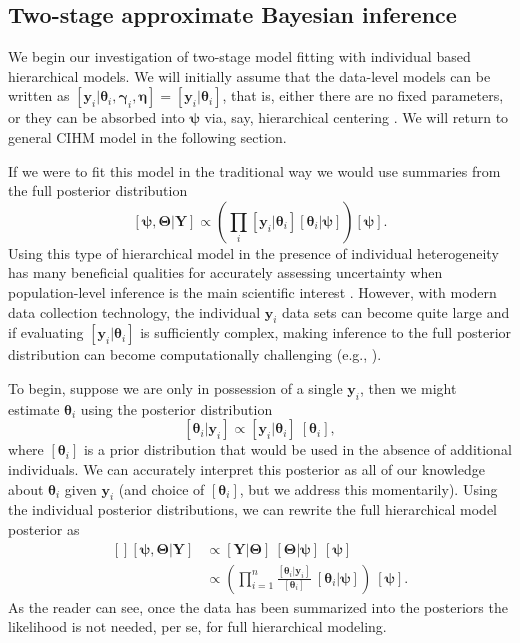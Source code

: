 \documentclass[12pt]{article}
\newcommand{\by}{\mathbf{y}}
\newcommand{\bt}{\boldsymbol{\theta}}
\newcommand{\bn}{\boldsymbol{\eta}}
\newcommand{\bT}{\boldsymbol{\Theta}}
\newcommand{\bp}{\boldsymbol{\psi}}
\newcommand{\bg}{\boldsymbol{\gamma}}
\newcommand{\bY}{\mathbf{Y}}
\begin{document}
\subsection{Two-stage approximate Bayesian inference}

We begin our investigation of two-stage model fitting with individual based hierarchical models. We will initially assume that the data-level models can be written as $[\by_i|\bt_i, \bg_i, \bn]=[\by_i|\bt_i]$, that is, either there are no fixed parameters, or they can be absorbed into $\bp$ via, say, hierarchical centering \citep{Gelfand:1996zq}. We will return to general CIHM model in the following section. 

If we were to fit this model in the traditional way we would use summaries from the full posterior distribution 
\[
[\bp, \bT|\bY] \propto \left(\prod_i[\by_i|\bt_i][\bt_i|\bp]\right) [\bp].
\]
Using this type of hierarchical model in the presence of individual heterogeneity has many beneficial qualities for accurately assessing uncertainty when population-level inference is the main scientific interest \citep{Cressie:2009rr}. However, with modern data collection technology, the individual $\by_i$ data sets can become quite large and if evaluating $[\by_i|\bt_i]$ is sufficiently complex, making inference to the full posterior distribution can become computationally challenging (e.g., \citealt{hooten2016hierarchical}).

To begin, suppose we are only in possession of a single $\by_i$, then we might estimate $\bt_i$ using the posterior distribution
\[
[\bt_i|\by_i] \propto [\by_i|\bt_i]\ [\bt_i],
\]
where $[\bt_i]$ is a prior distribution that would be used in the absence of additional individuals. We can accurately interpret this posterior as all of our knowledge about $\bt_i$ given $\by_i$ (and choice of $[\bt_i]$, but we address this momentarily). Using the individual posterior distributions, we can rewrite the full hierarchical model posterior as 
\begin{equation}
\label{eq:post}
\begin{aligned}[]
[\bp,\bT|\bY] &\propto [\bY|\bT]\ [\bT|\bp]\ [\bp]\\
& \propto \left(\prod_{i=1}^n\frac{[\bt_i|\by_i]}{[\bt_i]}\ [\bt_i|\bp]\right)\ [\bp].
\end{aligned}
\end{equation}
As the reader can see, once the data has been summarized into the posteriors the likelihood is not needed, per se, for full hierarchical modeling. 
\end{document}
